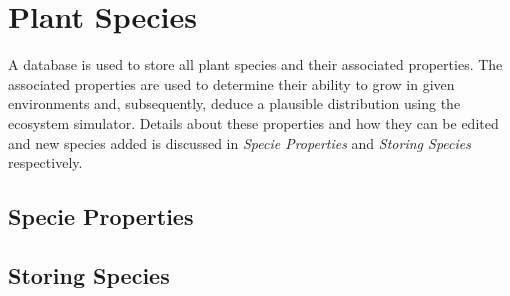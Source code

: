 \section{Plant Species}

A database is used to store all plant species and their associated properties. The associated properties are used to determine their ability to grow in given environments and, subsequently, deduce a plausible distribution using the ecosystem simulator. Details about these properties and how they can be edited and new species added is discussed in \textit{Specie Properties} and  \textit{Storing Species} respectively.

\subsection{Specie Properties}



\subsection{Storing Species}